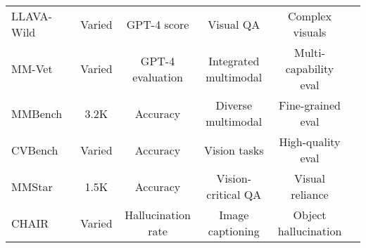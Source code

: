 \begin{table*}[!ht]
\begin{adjustbox}{width=\textwidth,keepaspectratio}
\begin{tabular}{lccccc}
LLAVA-Wild~\citep{liu2023visual} & Varied & GPT-4 score & Visual QA & Complex visuals & \\
MM-Vet~\citep{yu2024mm} & Varied & GPT-4 evaluation & Integrated multimodal & Multi-capability eval &  \\
MMBench~\citep{liu2024mmbench} & 3.2K & Accuracy & Diverse multimodal & Fine-grained eval &  \\
CVBench~\citep{tong2024cambrian} & Varied & Accuracy & Vision tasks & High-quality eval &  \\
MMStar~\citep{chen2024we} & 1.5K & Accuracy & Vision-critical QA & Visual reliance &  \\
CHAIR~\citep{rohrbach2018object} & Varied & Hallucination rate & Image captioning & Object hallucination &  \\

\bottomrule
\end{tabular}
\end{adjustbox}
\end{table*}